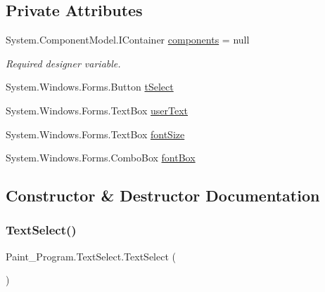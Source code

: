 \subsection*{Private Attributes}
\begin{DoxyCompactItemize}
\item 
System.\+Component\+Model.\+I\+Container \mbox{\hyperlink{class_paint___program_1_1_text_select_a9556871119e1c49f176bd3f166c0ee8a}{components}} = null
\begin{DoxyCompactList}\small\item\em Required designer variable. \end{DoxyCompactList}\item 
System.\+Windows.\+Forms.\+Button \mbox{\hyperlink{class_paint___program_1_1_text_select_a1699a2f7d0d90a693f56e94b04f8938c}{t\+Select}}
\item 
System.\+Windows.\+Forms.\+Text\+Box \mbox{\hyperlink{class_paint___program_1_1_text_select_a9e312c2dd6bfb8e6a6c71e261601c282}{user\+Text}}
\item 
System.\+Windows.\+Forms.\+Text\+Box \mbox{\hyperlink{class_paint___program_1_1_text_select_a1ebaf77e711e76309db950ad8860a68b}{font\+Size}}
\item 
System.\+Windows.\+Forms.\+Combo\+Box \mbox{\hyperlink{class_paint___program_1_1_text_select_a8dda856e1399742c79fa2ce6b95a9a94}{font\+Box}}
\end{DoxyCompactItemize}


\subsection{Constructor \& Destructor Documentation}
\mbox{\label{class_paint___program_1_1_text_select_a201ea8e6ffa368c5307ae7d0ece458c8}} 
\subsubsection{\texorpdfstring{Text\+Select()}{TextSelect()}}
{\footnotesize\ttfamily Paint\+\_\+\+Program.\+Text\+Select.\+Text\+Select (\begin{DoxyParamCaption}{ }\end{DoxyParamCaption})\hspace{0.3cm}{\ttfamily [inline]}}



